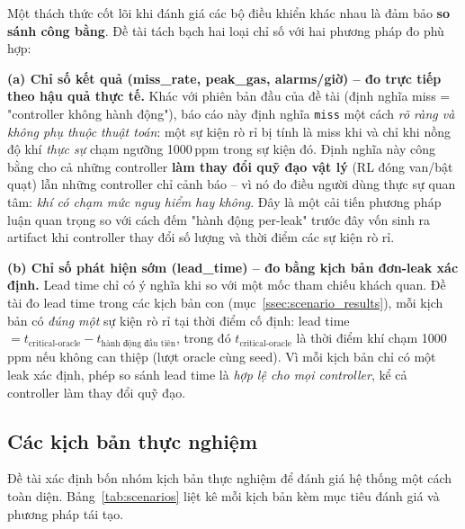Một thách thức cốt lõi khi đánh giá các bộ điều khiển khác nhau là đảm bảo \textbf{so sánh công bằng}. Đề tài tách bạch hai loại chỉ số với hai phương pháp đo phù hợp:

\textbf{(a) Chỉ số kết quả (miss\_rate, peak\_gas, alarms/giờ) -- đo trực tiếp theo hậu quả thực tế.} Khác với phiên bản đầu của đề tài (định nghĩa miss = "controller không hành động"), báo cáo này định nghĩa \texttt{miss} một cách \emph{rõ ràng và không phụ thuộc thuật toán}: một sự kiện rò rỉ bị tính là miss khi và chỉ khi nồng độ khí \emph{thực sự} chạm ngưỡng 1000\,ppm trong sự kiện đó. Định nghĩa này công bằng cho cả những controller \textbf{làm thay đổi quỹ đạo vật lý} (RL đóng van/bật quạt) lẫn những controller chỉ cảnh báo -- vì nó đo điều người dùng thực sự quan tâm: \emph{khí có chạm mức nguy hiểm hay không}. Đây là một cải tiến phương pháp luận quan trọng so với cách đếm "hành động per-leak" trước đây vốn sinh ra artifact khi controller thay đổi số lượng và thời điểm các sự kiện rò rỉ.

\textbf{(b) Chỉ số phát hiện sớm (lead\_time) -- đo bằng kịch bản đơn-leak xác định.} Lead time chỉ có ý nghĩa khi so với một mốc tham chiếu khách quan. Đề tài đo lead time trong các kịch bản con (mục~\ref{ssec:scenario_results}), mỗi kịch bản có \emph{đúng một} sự kiện rò rỉ tại thời điểm cố định: lead time $= t_{\text{critical-oracle}} - t_{\text{hành động đầu tiên}}$, trong đó $t_{\text{critical-oracle}}$ là thời điểm khí chạm 1000\,ppm nếu không can thiệp (lượt oracle cùng seed). Vì mỗi kịch bản chỉ có một leak xác định, phép so sánh lead time là \emph{hợp lệ cho mọi controller}, kể cả controller làm thay đổi quỹ đạo.

\subsection{Các kịch bản thực nghiệm}
\label{ssec:scenarios}

Đề tài xác định bốn nhóm kịch bản thực nghiệm để đánh giá hệ thống một cách toàn diện. Bảng~\ref{tab:scenarios} liệt kê mỗi kịch bản kèm mục tiêu đánh giá và phương pháp tái tạo.

